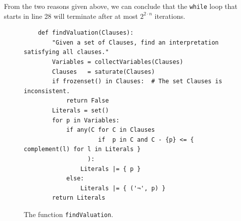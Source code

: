 From the two reasons given above, we can conclude that the \texttt{while} loop that starts in
line 28 will terminate after at most $2^{2 \cdot n}$ iterations.



\begin{figure}[!ht]
\centering
\begin{verbatim}
    def findValuation(Clauses):
        "Given a set of Clauses, find an interpretation satisfying all clauses."
        Variables = collectVariables(Clauses)
        Clauses   = saturate(Clauses)
        if frozenset() in Clauses:  # The set Clauses is inconsistent.
            return False
        Literals = set()
        for p in Variables:
            if any(C for C in Clauses 
                     if  p in C and C - {p} <= { complement(l) for l in Literals }
                  ):
                Literals |= { p }
            else:
                Literals |= { ('¬', p) }
        return Literals
\end{verbatim}
\vspace*{-0.3cm}
\caption{The function \texttt{findValuation}.}
\label{fig:Completeness.ipynb-3}
\end{figure}

\FloatBarrier

